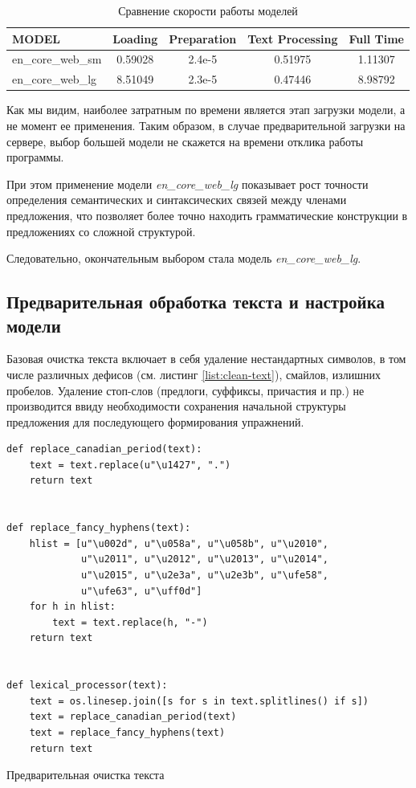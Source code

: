 \begin{table}
\centering
\caption{\label{tab:models-speed}Сравнение скорости работы моделей}
\begin{tabular}{@{}lcccc@{}}
\toprule
MODEL             & Loading & Preparation & Text Processing & Full Time \\ \midrule
en\_core\_web\_sm & 0.59028 & 2.4e-5      & 0.51975         & 1.11307   \\
en\_core\_web\_lg & 8.51049 & 2.3e-5      & 0.47446         & 8.98792   \\ \bottomrule
\end{tabular}
\end{table}

Как мы видим, наиболее затратным по времени является этап загрузки модели, а не момент ее применения. Таким образом, в случае предварительной загрузки на сервере, выбор большей модели не скажется на времени отклика работы программы.

При этом применение модели \emph{en\_core\_web\_lg} показывает рост точности определения семантических и синтаксических связей между членами предложения, что позволяет более точно находить грамматические конструкции в предложениях со сложной структурой. 

Следовательно, окончательным выбором стала модель \emph{en\_core\_web\_lg}.


\subsection{Предварительная обработка текста и настройка модели}
Базовая очистка текста включает в себя удаление нестандартных символов, в том числе различных дефисов (см. листинг \ref{list:clean-text}), смайлов, излишних пробелов. Удаление стоп-слов (предлоги, суффиксы, причастия и пр.) не производится ввиду необходимости сохранения начальной структуры предложения для последующего формирования упражнений.

\begin{ListingEnv}[h]
\begin{lstlisting}
def replace_canadian_period(text):
    text = text.replace(u"\u1427", ".")
    return text


def replace_fancy_hyphens(text):
    hlist = [u"\u002d", u"\u058a", u"\u058b", u"\u2010",
             u"\u2011", u"\u2012", u"\u2013", u"\u2014", 
             u"\u2015", u"\u2e3a", u"\u2e3b", u"\ufe58", 
             u"\ufe63", u"\uff0d"]
    for h in hlist:
        text = text.replace(h, "-")
    return text


def lexical_processor(text):
    text = os.linesep.join([s for s in text.splitlines() if s])
    text = replace_canadian_period(text)
    text = replace_fancy_hyphens(text)
    return text
\end{lstlisting}
\caption{Предварительная очистка текста}
\label{list:clean-text}
\end{ListingEnv}

